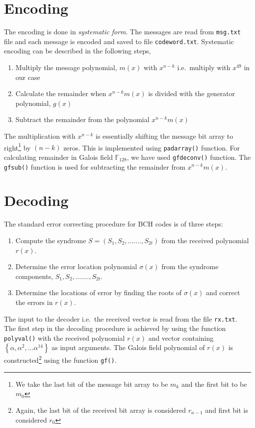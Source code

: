 \documentclass[a4paper]{article}
\begin{document}
\section{Encoding}
The encoding is done in \textit{systematic form}. The messages are read from \texttt{msg.txt} file and each message is encoded and saved to file \texttt{codeword.txt}. Systematic encoding can be described in the following steps,
\renewcommand{\labelenumi}{(\roman{enumi})}
\begin{enumerate}
	\item Multiply the message polynomial, $m(x)$ with $x^{n-k}$ i.e.\ multiply with $x^{49}$ in our case
    \item Calculate the remainder when $x^{n-k}m(x)$ is divided with the generator polynomial, $g(x)$
    \item Subtract the remainder from the polynomial $x^{n-k}m(x)$
\end{enumerate}
The multiplication with $x^{n-k}$ is essentially shifting the message bit array to right\footnote{We take the last bit of the message bit array to be $m_{k}$ and the first bit to be $m_{0}$} by $(n-k)$ zeros. This is implemented using \texttt{padarray()} function. For calculating remainder in Galois field $\mathbb{F}_{128}$, we have used \texttt{gfdeconv()} function. The \texttt{gfsub()} function is used for subtracting the remainder from $x^{n-k}m(x)$.

\section{Decoding}
The standard error correcting procedure for BCH codes is of three steps: 
\renewcommand{\labelenumi}{(\roman{enumi})}
\begin{enumerate}
	\item Compute the syndrome $S = (S_1, S_2,.......,S_{2t})$ from the received polynomial $r(x)$.
	\item Determine the error location polynomial $\sigma(x)$ from the syndrome components, $S_1, S_2,.......,S_{2t}$.
	\item Determine the locations of error by finding the roots of $\sigma(x)$ and correct the errors in $r(x)$.
\end{enumerate}
The input to the decoder i.e.\ the received vector is read from the file \texttt{rx.txt}. The first step in the decoding procedure is achieved by using the function \texttt{polyval()} with the received polynomial $r(x)$ and vector containing $\left\lbrace \alpha, \alpha^{2}, \hdots \alpha^{14} \right\rbrace$ as input arguments. The Galois field polynomial of $r(x)$ is constructed\footnote{Again, the last bit of the received bit array is considered $r_{n-1}$ and first bit is considered $r_{0}$} using the function \texttt{gf()}.
\end{document}
